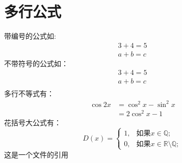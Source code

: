 \documentclass[10]{article}
\begin{document}
	\section{多行公式}
	
	带编号的公式如:
	\begin{gather}
		3+4=5\\
		a+b=c
	\end{gather}
	不带符号的公式如：
	\begin{gather*}
	3+4=5\\
	a+b=c\\
	\end{gather*}
	多行不等式有：
	\begin{equation}
		\begin{split}
		\cos 2x &= \cos^2 x -\sin^2 x \\
		&=2\cos^2 x - 1
		\end{split}
	\end{equation}
	花括号大公式有：
	\begin{equation}
		D(x)=\begin{cases}
		1,&\text{如果} x \in \mathbb{Q};\\
		0,&\text{如果} x \in \mathbb{R}\setminus\mathbb{Q};
		\end{cases}
	\end{equation}
	这是一个文件的引用\cite{patashnik1988designing}
	
	
\end{document}
